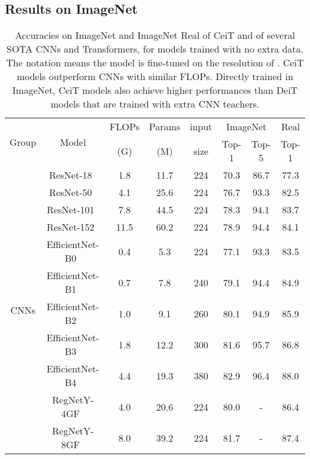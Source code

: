 \documentclass[10pt,twocolumn,letterpaper]{article}
\begin{document}
\subsection{Results on ImageNet}\label{sec:exp_imagenet}

\begin{table*}[t]
    \centering
    \footnotesize
    \caption{Accuracies on ImageNet and ImageNet Real of CeiT and of several SOTA CNNs and Transformers, for models trained with no extra data. The notation  means the model is fine-tuned on the resolution of . CeiT models outperform CNNs with similar FLOPs. Directly trained in ImageNet, CeiT models also achieve higher performances than DeiT models that are trained with extra CNN teachers.}
    \begin{tabular}{c|c|ccc|cc|c}
        \toprule
        \multirow{2}{*}{Group} &\multirow{2}{*}{Model} & FLOPs & Params & input
        & \multicolumn{2}{c|}{ImageNet} & Real \\
        & & (G) & (M) & size & Top-1 & Top-5 & Top-1 \\
        \midrule
        \multirow{12}{*}{CNNs}&ResNet-18~\cite{DBLP:conf/cvpr/HeZRS16} & 1.8 & 11.7 & 224 & 70.3 & 86.7 & 77.3 \\
        &ResNet-50~\cite{DBLP:conf/cvpr/HeZRS16} & 4.1 & 25.6 & 224 & 76.7 & 93.3 & 82.5 \\
        &ResNet-101~\cite{DBLP:conf/cvpr/HeZRS16} & 7.8 & 44.5 & 224 & 78.3 & 94.1 & 83.7 \\
        &ResNet-152~\cite{DBLP:conf/cvpr/HeZRS16} & 11.5 & 60.2 & 224 & 78.9 & 94.4 & 84.1 \\
        \cmidrule{2-8}
        &EfficientNet-B0~\cite{DBLP:conf/icml/TanL19} & 0.4 & 5.3 & 224 & 77.1 & 93.3 & 83.5 \\
        &EfficientNet-B1~\cite{DBLP:conf/icml/TanL19} & 0.7 & 7.8 & 240 & 79.1 & 94.4 & 84.9 \\
        &EfficientNet-B2~\cite{DBLP:conf/icml/TanL19} & 1.0 & 9.1 & 260 & 80.1 & 94.9 & 85.9 \\
        &EfficientNet-B3~\cite{DBLP:conf/icml/TanL19} & 1.8 & 12.2 & 300 & 81.6 & 95.7 & 86.8 \\
        &EfficientNet-B4~\cite{DBLP:conf/icml/TanL19} & 4.4 & 19.3 & 380 & 82.9 & 96.4 & 88.0 \\
\cmidrule{2-8}
        &RegNetY-4GF~\cite{radosavovic2020designing} & 4.0 & 20.6 & 224 & 80.0 & - & 86.4 \\
        &RegNetY-8GF~\cite{radosavovic2020designing} & 8.0 & 39.2 & 224 & 81.7 & - & 87.4 \\

\end{tabular}
\end{table*}
\end{document}

